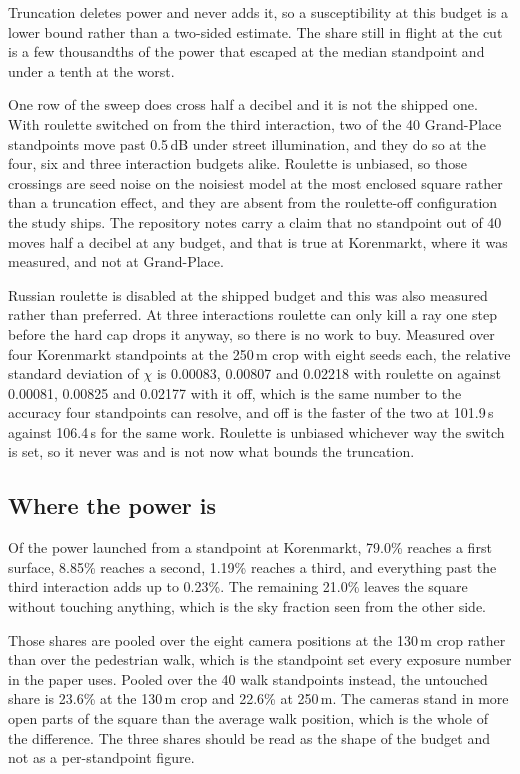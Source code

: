 \documentclass[journal]{IEEEtran}
\begin{document}
Truncation deletes power and never adds it, so a susceptibility at this budget
is a lower bound rather than a two-sided estimate. The share still in flight at
the cut is a few thousandths of the power that escaped at the median standpoint
and under a tenth at the worst.

One row of the sweep does cross half a decibel and it is not the shipped one.
With roulette switched on from the third interaction, two of the 40 Grand-Place
standpoints move past 0.5\,dB under street illumination, and they do so at the
four, six and three interaction budgets alike. Roulette is unbiased, so those
crossings are seed noise on the noisiest model at the most enclosed square
rather than a truncation effect, and they are absent from the roulette-off
configuration the study ships. The repository notes carry a claim that no
standpoint out of 40 moves half a decibel at any budget, and that is true at
Korenmarkt, where it was measured, and not at Grand-Place.

Russian roulette is disabled at the shipped budget and this was also measured
rather than preferred. At three interactions roulette can only kill a ray one
step before the hard cap drops it anyway, so there is no work to buy. Measured
over four Korenmarkt standpoints at the 250\,m crop with eight seeds each, the
relative standard deviation of $\chi$ is 0.00083, 0.00807 and 0.02218 with
roulette on against 0.00081, 0.00825 and 0.02177 with it off, which is the same
number to the accuracy four standpoints can resolve, and off is the faster of
the two at 101.9\,s against 106.4\,s for the same work. Roulette is unbiased
whichever way the switch is set, so it never was and is not now what bounds the
truncation.

\subsection{Where the power is}

Of the power launched from a standpoint at Korenmarkt, 79.0\% reaches a first
surface, 8.85\% reaches a second, 1.19\% reaches a third, and everything past
the third interaction adds up to 0.23\%. The remaining 21.0\% leaves the square
without touching anything, which is the sky fraction seen from the other side.

Those shares are pooled over the eight camera positions at the 130\,m crop
rather than over the pedestrian walk, which is the standpoint set every exposure
number in the paper uses. Pooled over the 40 walk standpoints instead, the
untouched share is 23.6\% at the 130\,m crop and 22.6\% at 250\,m. The cameras
stand in more open parts of the square than the average walk position, which is
the whole of the difference. The three shares should be read as the shape of the
budget and not as a per-standpoint figure.
\end{document}
